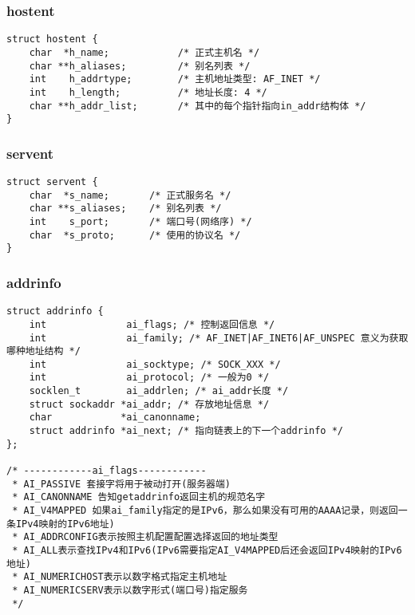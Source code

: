 \subsubsection{hostent}
\begin{verbatim}
struct hostent {
    char  *h_name;            /* 正式主机名 */
    char **h_aliases;         /* 别名列表 */
    int    h_addrtype;        /* 主机地址类型: AF_INET */
    int    h_length;          /* 地址长度: 4 */
    char **h_addr_list;       /* 其中的每个指针指向in_addr结构体 */
}
\end{verbatim}

\subsubsection{servent}
\begin{verbatim}
struct servent {
    char  *s_name;       /* 正式服务名 */
    char **s_aliases;    /* 别名列表 */
    int    s_port;       /* 端口号(网络序) */
    char  *s_proto;      /* 使用的协议名 */
}
\end{verbatim}

\subsubsection{addrinfo}
\begin{verbatim}
struct addrinfo {
    int              ai_flags; /* 控制返回信息 */
    int              ai_family; /* AF_INET|AF_INET6|AF_UNSPEC 意义为获取哪种地址结构 */
    int              ai_socktype; /* SOCK_XXX */
    int              ai_protocol; /* 一般为0 */
    socklen_t        ai_addrlen; /* ai_addr长度 */
    struct sockaddr *ai_addr; /* 存放地址信息 */
    char            *ai_canonname;
    struct addrinfo *ai_next; /* 指向链表上的下一个addrinfo */
};

/* ------------ai_flags------------
 * AI_PASSIVE 套接字将用于被动打开(服务器端)
 * AI_CANONNAME 告知getaddrinfo返回主机的规范名字
 * AI_V4MAPPED 如果ai_family指定的是IPv6，那么如果没有可用的AAAA记录，则返回一条IPv4映射的IPv6地址)
 * AI_ADDRCONFIG表示按照主机配置配置选择返回的地址类型
 * AI_ALL表示查找IPv4和IPv6(IPv6需要指定AI_V4MAPPED后还会返回IPv4映射的IPv6地址)
 * AI_NUMERICHOST表示以数字格式指定主机地址
 * AI_NUMERICSERV表示以数字形式(端口号)指定服务
 */
\end{verbatim}

